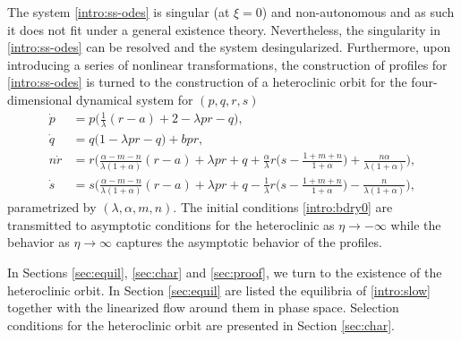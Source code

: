 \documentclass[a4paper,11pt]{article}
\theoremstyle{remark}
\begin{document}
The system \eqref{intro:ss-odes} is singular (at $\xi=0$) and non-autonomous and as such it does not fit under a general existence theory.
Nevertheless,  the singularity in \eqref{intro:ss-odes} can be resolved and the system desingularized. Furthermore, upon introducing a series of nonlinear transformations,  the construction of profiles for \eqref{intro:ss-odes} is turned to the
construction of a heteroclinic orbit for the four-dimensional dynamical system for $(p,q,r,s)$
\begin{equation}\label{intro:slow}\tag{S}
 \begin{aligned}
 \dot{p} &=p\Big(\frac{1}{\lambda}(r-a) + 2- \lambda p r -q\Big), \\
 \dot{q} &=q\Big(1 -\lambda p r -q\Big) + b p r,\\
 n\dot{r} &=r\Big(\frac{\alpha-m-n}{\lambda(1+\alpha)}(r-a) + \lambda pr + q +\frac{\alpha}{\lambda}r\big(s- \frac{1+m+n}{1+\alpha}\big) + \frac{n\alpha}{\lambda(1+\alpha)}\Big),\\
 \dot{s} &=s\Big(\frac{\alpha-m-n}{\lambda(1+\alpha)}(r-a) + \lambda pr + q - \frac{1}{\lambda}r\big(s- \frac{1+m+n}{1+\alpha}\big) - \frac{n}{\lambda(1+\alpha)}\Big),
 \end{aligned}
\end{equation}
parametrized by $(\lambda,\alpha,m,n)$. The initial conditions \eqref{intro:bdry0} are transmitted to asymptotic conditions for the heteroclinic
as $\eta \to -\infty$ while the behavior as $\eta \to \infty$ captures the asymptotic behavior of the profiles.


In Sections \ref{sec:equil}, \ref{sec:char} and \ref{sec:proof}, we turn to the existence of the heteroclinic orbit. In Section  \ref{sec:equil} are listed
the equilibria of  \eqref{intro:slow} together with the linearized flow around them in phase space. Selection conditions for the  heteroclinic orbit 
are presented in Section \ref{sec:char}.
\end{document}
